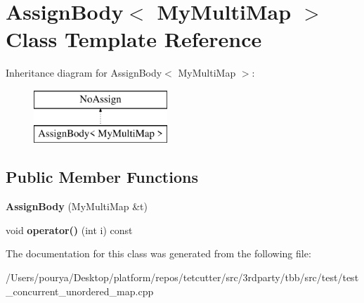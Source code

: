 \hypertarget{classAssignBody_3_01MyMultiMap_01_4}{}\section{Assign\+Body$<$ My\+Multi\+Map $>$ Class Template Reference}
\label{classAssignBody_3_01MyMultiMap_01_4}
Inheritance diagram for Assign\+Body$<$ My\+Multi\+Map $>$\+:\begin{figure}[H]
\begin{center}
\leavevmode
\includegraphics[height=2.000000cm]{classAssignBody_3_01MyMultiMap_01_4}
\end{center}
\end{figure}
\subsection*{Public Member Functions}
\begin{DoxyCompactItemize}
\item 
\hypertarget{classAssignBody_3_01MyMultiMap_01_4_a944910e97d83c6efd3e27f6fd15ba01d}{}{\bfseries Assign\+Body} (My\+Multi\+Map \&t)\label{classAssignBody_3_01MyMultiMap_01_4_a944910e97d83c6efd3e27f6fd15ba01d}

\item 
\hypertarget{classAssignBody_3_01MyMultiMap_01_4_ac5c3c7f80278acee95d3df1e0433773c}{}void {\bfseries operator()} (int i) const \label{classAssignBody_3_01MyMultiMap_01_4_ac5c3c7f80278acee95d3df1e0433773c}

\end{DoxyCompactItemize}


The documentation for this class was generated from the following file\+:\begin{DoxyCompactItemize}
\item 
/\+Users/pourya/\+Desktop/platform/repos/tetcutter/src/3rdparty/tbb/src/test/test\+\_\+concurrent\+\_\+unordered\+\_\+map.\+cpp\end{DoxyCompactItemize}
